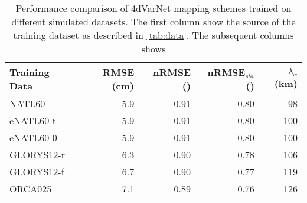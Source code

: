 \begin{table}[h!]
\begin{tabular}{l||rrrr|}
\toprule
Training Data & RMSE (cm) & nRMSE () & nRMSE$_{sla}$ () & $\lambda_x$ (km) \\
\midrule
NATL60 & 5.9  & 0.91  & 0.80  & 98 \\
eNATL60-t & 5.9  & 0.91  & 0.80  & 100 \\
eNATL60-0 & 5.9  & 0.91  & 0.80  & 100 \\
GLORYS12-r & 6.3  & 0.90  & 0.78  & 106 \\
GLORYS12-f & 6.7  & 0.90  & 0.77  & 119 \\
ORCA025 & 7.1  & 0.89  & 0.76  & 126 \\
\bottomrule
\end{tabular}
\label{tab:res}
\caption{Performance comparison of 4dVarNet mapping schemes trained on different simulated datasets. The first column show the source of the training dataset as described in \ref{tab:data}. The subsequent columns shows }
\end{table}